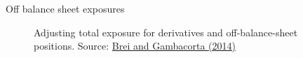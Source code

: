 

\begin{frame}{Off balance sheet exposures}

\begin{figure}
\begin{center}


\caption{\label{fig:L4_total_exposure_incl_derivs_off_bs} Adjusting total exposure for derivatives and off-balance-sheet positions. Source: \href{https://www.bis.org/publ/work471.pdf}{Brei and Gambacorta (2014)}}

\end{center}
\end{figure}

\end{frame}




